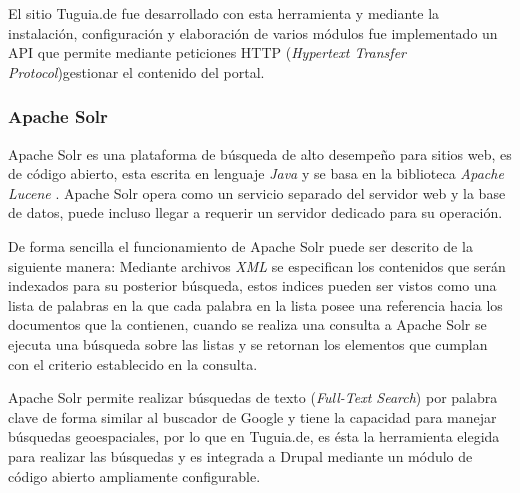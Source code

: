El sitio Tuguia.de fue desarrollado con esta herramienta y mediante la instalación, configuración y elaboración de varios módulos fue implementado un API que permite mediante peticiones HTTP (\textit{Hypertext Transfer Protocol})gestionar el contenido del portal.

\subsubsection{Apache Solr}

Apache Solr es una plataforma de búsqueda de alto desempeño para sitios web, es de código abierto, esta escrita en lenguaje \textit{Java} y se basa en la biblioteca \textit{Apache Lucene} \cite{APS}. Apache Solr opera como un servicio separado del servidor web y la base de datos, puede incluso llegar a requerir un servidor dedicado para su operación. 

De forma sencilla el funcionamiento de Apache Solr puede ser descrito de la siguiente manera: Mediante archivos \textit{XML} se especifican los contenidos que serán indexados para su posterior búsqueda, estos indices pueden ser vistos como una lista de palabras en la que cada palabra en la lista posee una referencia hacia los documentos que la contienen, cuando se realiza una consulta a Apache Solr se ejecuta una búsqueda sobre las listas y se retornan los elementos que cumplan con el criterio establecido en la consulta.

Apache Solr permite realizar búsquedas de texto (\textit{Full-Text Search}) por palabra clave de forma similar al buscador de Google y tiene la capacidad para manejar búsquedas geoespaciales, por lo que en Tuguia.de, es ésta la herramienta elegida para realizar las búsquedas y es integrada a Drupal mediante un módulo de código abierto ampliamente configurable.  
